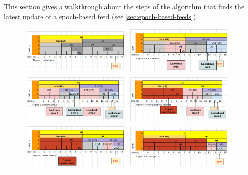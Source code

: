 This section gives a walkthrough about the steps of the algorithm that finds the latest update of a epoch-based feed  (see \ref{sec:epoch-based-feeds}).

\begin{figure}[htbp]
\centering
\begin{tabular}{c|c}
\includegraphics[width=.5\textwidth]{fig/feeds/0.png}&\includegraphics[width=.5\textwidth]{fig/feeds/1.png}\\
\includegraphics[width=.5\textwidth]{fig/feeds/2.png}&\includegraphics[width=.5\textwidth]{fig/feeds/3.png}\\
\includegraphics[width=.5\textwidth]{fig/feeds/4.png}&\includegraphics[width=.5\textwidth]{fig/feeds/5.png}\\

\end{tabular}
\end{figure}
